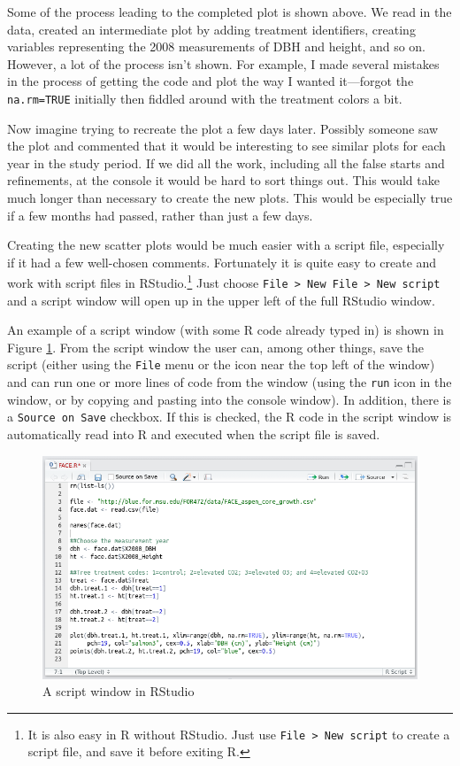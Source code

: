 \documentclass[]{krantz}
\theoremstyle{definition}
\theoremstyle{definition}
\theoremstyle{definition}
\theoremstyle{remark}
\begin{document}
Some of the process leading to the completed plot is shown above. We
read in the data, created an intermediate plot by adding treatment
identifiers, creating variables representing the 2008 measurements of
DBH and height, and so on. However, a lot of the process isn't shown.
For example, I made several mistakes in the process of getting the code
and plot the way I wanted it---forgot the \texttt{na.rm=TRUE} initially
then fiddled around with the treatment colors a bit.

Now imagine trying to recreate the plot a few days later. Possibly
someone saw the plot and commented that it would be interesting to see
similar plots for each year in the study period. If we did all the work,
including all the false starts and refinements, at the console it would
be hard to sort things out. This would take much longer than necessary
to create the new plots. This would be especially true if a few months
had passed, rather than just a few days.

Creating the new scatter plots would be much easier with a script file,
especially if it had a few well-chosen comments. Fortunately it is quite
easy to create and work with script files in RStudio.\footnote{It is
  also easy in R without RStudio. Just use
  \texttt{File\ \textgreater{}\ New\ script} to create a script file,
  and save it before exiting R.} Just choose
\texttt{File\ \textgreater{}\ New\ File\ \textgreater{}\ New\ script}
and a script window will open up in the upper left of the full RStudio
window.

An example of a script window (with some R code already typed in) is
shown in Figure \ref{fig:script}. From the script window the user can,
among other things, save the script (either using the \texttt{File} menu
or the icon near the top left of the window) and can run one or more
lines of code from the window (using the \texttt{run} icon in the
window, or by copying and pasting into the console window). In addition,
there is a \texttt{Source\ on\ Save} checkbox. If this is checked, the R
code in the script window is automatically read into R and executed when
the script file is saved.

\begin{figure}

{\centering \includegraphics[width=1\linewidth]{03-scripts/03-images/FACE-script-screenshot} 

}

\caption{A script window in RStudio}\label{fig:script}
\end{figure}
\end{document}
